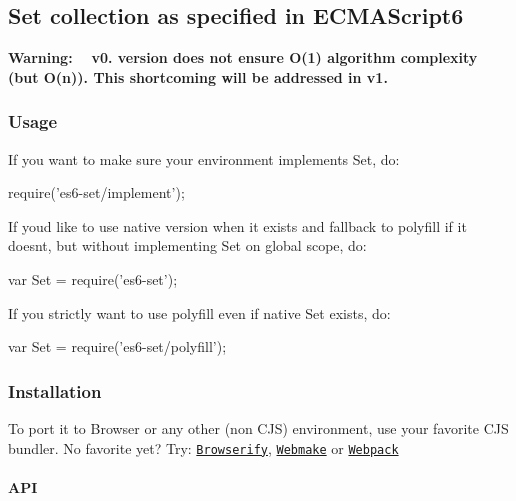 \subsection*{Set collection as specified in E\+C\+M\+A\+Script6}

{\bfseries Warning\+: ~\newline
v0. version does not ensure O(1) algorithm complexity (but O(n)). This shortcoming will be addressed in v1.}

\subsubsection*{Usage}

If you want to make sure your environment implements {\ttfamily Set}, do\+:


\begin{DoxyCode}
require('es6-set/implement');
\end{DoxyCode}


If you\textquotesingle{}d like to use native version when it exists and fallback to polyfill if it doesn\textquotesingle{}t, but without implementing {\ttfamily Set} on global scope, do\+:


\begin{DoxyCode}
var Set = require('es6-set');
\end{DoxyCode}


If you strictly want to use polyfill even if native {\ttfamily Set} exists, do\+:


\begin{DoxyCode}
var Set = require('es6-set/polyfill');
\end{DoxyCode}


\subsubsection*{Installation}



To port it to Browser or any other (non C\+JS) environment, use your favorite C\+JS bundler. No favorite yet? Try\+: \href{http://browserify.org/}{\tt Browserify}, \href{https://github.com/medikoo/modules-webmake}{\tt Webmake} or \href{http://webpack.github.io/}{\tt Webpack}

\paragraph*{A\+PI}

